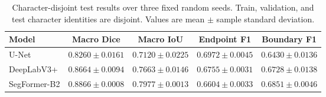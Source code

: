 \begin{table}[t]
\centering
\caption{Character-disjoint test results over three fixed random seeds. Train,
validation, and test character identities are disjoint. Values are mean
\(\pm\) sample standard deviation.}
\label{tab:character-disjoint}
\small
\begin{tabular}{lcccc}
\toprule
Model & Macro Dice & Macro IoU & Endpoint F1 & Boundary F1 \\
\midrule
U-Net
  & \(0.8260 \pm 0.0161\)
  & \(0.7120 \pm 0.0225\)
  & \(\mathbf{0.6972 \pm 0.0045}\)
  & \(0.6430 \pm 0.0136\) \\
DeepLabV3+
  & \(0.8664 \pm 0.0094\)
  & \(0.7663 \pm 0.0146\)
  & \(0.6755 \pm 0.0031\)
  & \(0.6728 \pm 0.0138\) \\
SegFormer-B2
  & \(\mathbf{0.8866 \pm 0.0008}\)
  & \(\mathbf{0.7977 \pm 0.0013}\)
  & \(0.6604 \pm 0.0033\)
  & \(\mathbf{0.6851 \pm 0.0046}\) \\
\bottomrule
\end{tabular}
\end{table}
